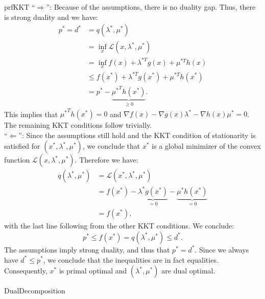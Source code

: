 \begin{prf}[KKT]{prfKKT}
    ``$\Rightarrow$'': 
    Because of the assumptions, there is no duality gap. Thus, there is strong duality and we have:
    \begin{align*}
        p^* = d^* 
            &= q(\lambda^*,\mu^*) \\
            &= \inf_{x} \mathcal{L}(x,\lambda^*,\mu^*) \\
            &= \inf_{x} f(x) + \lambda^{*T} g(x) + \mu^{*T} h(x) \\
            &\leq f(x^*) + \lambda^{*T} g(x^*) + \mu^{*T} h(x^*) \\
            &= p^* - \underbrace{{\mu^*}^T h(x^*)}_{\geq 0}. 
    \end{align*}
    This implies that ${\mu^*}^T h(x^*) = 0$ and $\nabla f(x) - \nabla g(x) \lambda^* - \nabla h(x) \mu^* = 0$. The remaining KKT conditions follow trivially. \\

    ``$\Leftarrow$'': 
    Since the assumptions still hold and the KKT condition of stationarity is satisfied for $(x^*, \lambda^*, \mu^*)$, we conclude that $x^*$ is a global minimizer of the convex function $\mathcal{L}(x, \lambda^*, \mu^*)$. Therefore we have:
    \begin{align*}
        q(\lambda^*,\mu^*) &= \mathcal{L}(x^*, \lambda^*, \mu^*) \\
            &= f(x^*) - \underbrace{\lambda^*g(x^*)}_{= 0} - \underbrace{\mu^*h(x^*)}_{= 0} \\
            &= f(x^*),
    \end{align*}
    with the last line following from the other KKT conditions. We conclude:
    \begin{equation*}
        p^* \leq f(x^*) = q(\lambda^*,\mu^*) \leq d^*.
    \end{equation*}
    The assumptions imply strong duality, and thus that $p^* = d^*$. Since we always have $d^* \leq p^*$, we conclude that the inequalities are in fact equalities. Consequently, $x^*$ is primal optimal and $(\lambda^*, \mu^*)$ are dual optimal.
\end{prf}

\begin{ex}{DualDecomposition}

\end{ex}